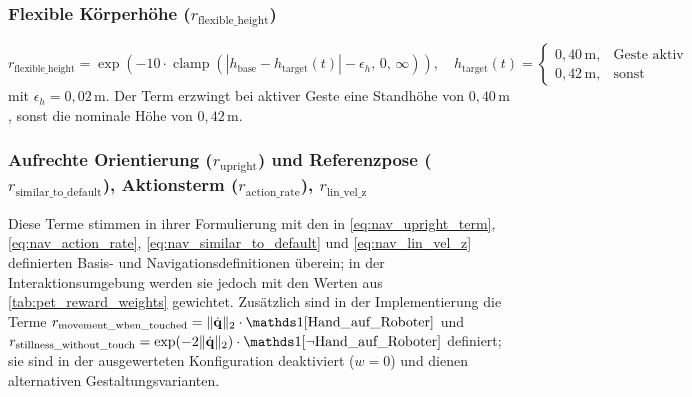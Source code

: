 \subsubsection{Flexible Körperhöhe ($r_{\text{flexible\_height}}$)}
\begin{equation}\label{eq:pet_flexible_height_math}
r_{\text{flexible\_height}} = \exp\!\left(-10\cdot\operatorname{clamp}\!\left(|h_{\text{base}} - h_{\text{target}}(t)| - \epsilon_h,\,0,\,\infty\right)\right),\quad
h_{\text{target}}(t) = \begin{cases} 0{,}40\,\text{m}, & \text{Geste aktiv} \\ 0{,}42\,\text{m}, & \text{sonst} \end{cases}
\end{equation}
mit $\epsilon_h = 0{,}02\,\text{m}$. Der Term erzwingt bei aktiver Geste eine Standhöhe von $0{,}40\,\text{m}$, sonst die nominale Höhe von $0{,}42\,\text{m}$.

\subsubsection{Aufrechte Orientierung ($r_{\text{upright}}$) und Referenzpose ($r_{\text{similar\_to\_default}}$), Aktionsterm ($r_{\text{action\_rate}}$), $r_{\text{lin\_vel\_z}}$}
Diese Terme stimmen in ihrer Formulierung mit den in \autoref{eq:nav_upright_term}, \autoref{eq:nav_action_rate}, \autoref{eq:nav_similar_to_default} und \autoref{eq:nav_lin_vel_z} definierten Basis- und Navigationsdefinitionen überein; in der Interaktionsumgebung werden sie jedoch mit den Werten aus \autoref{tab:pet_reward_weights} gewichtet. Zusätzlich sind in der Implementierung die Terme $r_{\text{movement\_when\_touched}} = \lVert\dot{\mathbf{q}}\rVert_2\cdot\ind[\text{Hand\_auf\_Roboter}]$ und $r_{\text{stillness\_without\_touch}} = \exp(-2\lVert\dot{\mathbf{q}}\rVert_2)\cdot\ind[\neg\text{Hand\_auf\_Roboter}]$ definiert; sie sind in der ausgewerteten Konfiguration deaktiviert ($w=0$) und dienen alternativen Gestaltungsvarianten.

